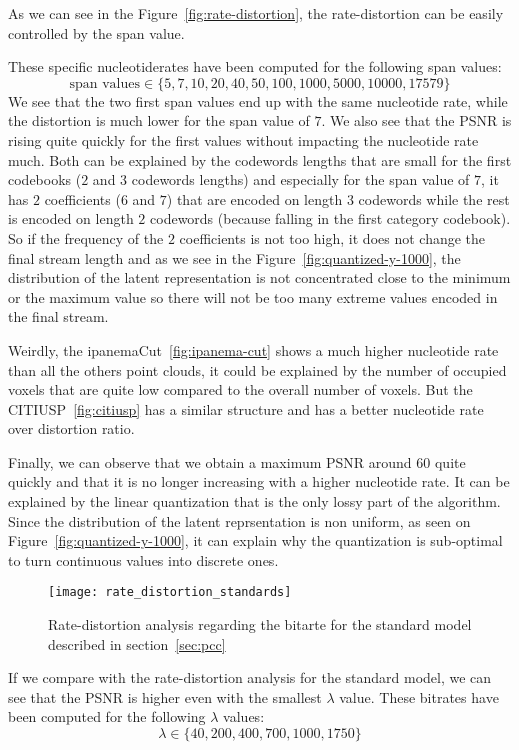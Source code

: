 As we can see in the Figure~\ref{fig:rate-distortion}, the rate-distortion can be easily controlled by the span value. 

These specific nucleotiderates have been computed for the following span values: $$\text{span values} \in \{5, 7, 10, 20, 40, 50, 100, 1000, 5000, 10000, 17579\}$$
We see that the two first span values end up with the same nucleotide rate, while the distortion is much lower for the span value of $7$. We also see that the PSNR is rising quite quickly for the first values without impacting the nucleotide rate much. Both can be explained by the codewords lengths that are small for the first codebooks ($2$ and $3$ codewords lengths) and especially for the span value of $7$, it has $2$ coefficients ($6$ and $7$) that are encoded on length $3$ codewords while the rest is encoded on length $2$ codewords (because falling in the first category codebook). So if the frequency of the $2$ coefficients is not too high, it does not change the final stream length and as we see in the Figure~\ref{fig:quantized-y-1000}, the distribution of the latent representation is not concentrated close to the minimum or the maximum value so there will not be too many extreme values encoded in the final stream.

Weirdly, the ipanemaCut~\ref{fig:ipanema-cut} shows a much higher nucleotide rate than all the others point clouds, it could be explained by the number of occupied voxels that are quite low compared to the overall number of voxels. But the CITIUSP~\ref{fig:citiusp} has a similar structure and has a better nucleotide rate over distortion ratio.

Finally, we can observe that we obtain a maximum PSNR around $60$ quite quickly and that it is no longer increasing with a higher nucleotide rate. It can be explained by the linear quantization that is the only lossy part of the algorithm. Since the distribution of the latent reprsentation is non uniform, as seen on Figure~\ref{fig:quantized-y-1000}, it can explain why the quantization is sub-optimal to turn continuous values into discrete ones.

\begin{figure}[ht]
    \centering
    \texttt{[image: rate\_distortion\_standards]}
    \caption{Rate-distortion analysis regarding the bitarte for the standard model described in section~\ref{sec:pcc}}
    \label{fig:rate-distortion-standards}
\end{figure}

If we compare with the rate-distortion analysis for the standard model, we can see that the PSNR is higher even with the smallest $\lambda$ value. These bitrates have been computed for the following $\lambda$ values:
$$
\lambda \in \{40,200,400,700,1000,1750\}
$$

